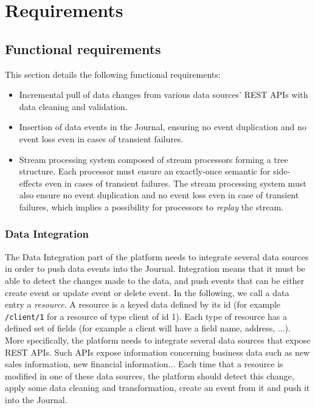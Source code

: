 \chapter{Requirements}

\section{Functional requirements}

This section details the following functional requirements:
\begin{itemize}
  \item Incremental pull of data changes from various data sources' REST APIs with data cleaning and validation.
  \item Insertion of data events in the Journal, ensuring no event duplication and no event loss even in cases of transient failures.
  \item Stream processing system composed of stream processors forming a tree structure. Each processor must ensure an exactly-once semantic for side-effects even in cases of transient failures. The stream processing system must also ensure no event duplication and no event loss even in case of transient failures, which implies a possibility for processors to \textit{replay} the stream.
\end{itemize}

\subsection{Data Integration}

The Data Integration part of the platform needs to integrate several data sources in order to push data events into the Journal. Integration means that it must be able 
to detect the changes made to the data, and push events that can be either create event or update event or delete event.
In the following, we call a data entry a \textit{resource}. A resource is a keyed data defined by its id (for example \verb|/client/1| for a
resource of type client of id 1). Each type of resource has a defined set of fields (for example a client
will have a field name, address, ...).
\\

More specifically, the platform needs to integrate several data sources that expose REST APIs. Such APIs expose information
concerning business data such as new sales information, new financial information...
Each time that a resource is modified in one of these data sources, the platform should detect this change, apply some data cleaning and transformation, create an 
event from it and push it into the Journal.

